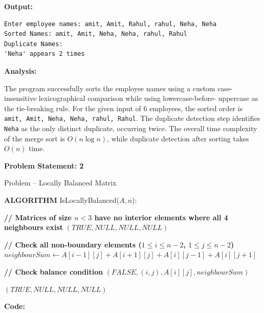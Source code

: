 \documentclass[12pt]{article}
\begin{document}
\textbf{Output:}

\begin{lstlisting}[style=output]
Enter employee names: amit, Amit, Rahul, rahul, Neha, Neha
Sorted Names: amit, Amit, Neha, Neha, rahul, Rahul
Duplicate Names:
'Neha' appears 2 times
\end{lstlisting}


\textbf{Analysis:}

The program successfully sorts the employee names using a custom
case-insensitive lexicographical comparison while using lowercase-before-
uppercase as the tie-breaking rule. For the given input of 6 employees,
the sorted order is \texttt{amit, Amit, Neha, Neha, rahul, Rahul}. The
duplicate detection step identifies \texttt{Neha} as the only distinct
duplicate, occurring twice. The overall time complexity of the merge sort
is $O(n\log n)$, while duplicate detection after sorting takes $O(n)$
time.

\newpage
\textbf{Problem Statement: 2}

Problem – Locally Balanced Matrix


\begin{algorithm}[H]
\caption{IsLocallyBalanced}
\begin{algorithmic}[1]

\State \textbf{ALGORITHM} IsLocallyBalanced($A, n$):

\State \textbf{// Matrices of size $n < 3$ have no interior elements where all 4 neighbours exist}
    \State \Return $(TRUE, NULL, NULL, NULL)$
\EndIf

\State \textbf{// Check all non-boundary elements ($1 \leq i \leq n-2$, $1 \leq j \leq n-2$)}
        \State $neighbourSum \gets A[i-1][j] + A[i+1][j] + A[i][j-1] + A[i][j+1]$

        \State \textbf{// Check balance condition}
            \State \Return $(FALSE, (i,j), A[i][j], neighbourSum)$
        \EndIf
    \EndFor
\EndFor

\State \Return $(TRUE, NULL, NULL, NULL)$

\end{algorithmic}
\end{algorithm}

\textbf{Code:}
\end{document}
